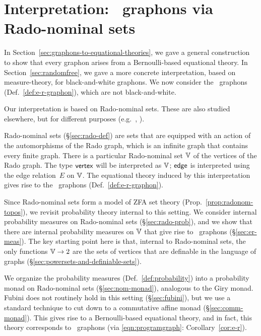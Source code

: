\section{Interpretation: \ErdosRenyi\ graphons via Rado-nominal sets}
\label{sec:ER-Rado}
In Section~\ref{sec:graphons-to-equational-theories}, we gave a general construction to show that every graphon arises from a Bernoulli-based equational theory.
In Section~\ref{sec:randomfree}, we gave a more concrete interpretation, based on measure-theory, for black-and-white graphons. 
We now consider the \ErdosRenyi\ graphons (Def.~\ref{def:e-r-graphon}), which are not black-and-white. 

Our interpretation is based on Rado-nominal sets. These are also studied elsewhere, but for different purposes (e.g.~\cite{lmcs:1157,bojancyk-place,homomorphisms-fodef}, \cite[\S1.9]{pitts-nom-book}).

Rado-nominal sets (\S\ref{sec:rado-def}) are sets that are equipped with an action of the automorphisms of the Rado graph, which is an infinite graph that contains every finite graph.
There is a particular Rado-nominal set $\mathbb{V}$ of the vertices of the Rado graph. The type $\mathsf{vertex}$ will be interpreted as $\mathbb{V}$;
$\mathsf{edge}$ is interpreted using the edge relation~$E$ on $\mathbb{V}$.
The equational theory induced by this interpretation gives rise to the \ErdosRenyi\ graphons (Def.~\ref{def:e-r-graphon}).

Since Rado-nominal sets form a model of ZFA set theory (Prop.~\ref{prop:radonom-topos}), we revisit
probability theory internal to this setting. We consider internal probability measures on Rado-nominal sets (\S\ref{sec:rado-prob}), and we show that there are internal probability measures on $\mathbb{V}$ that give rise to \ErdosRenyi\ graphons (\S\ref{sec:er-meas}). The key starting point here is that, internal to Rado-nominal sets, the only functions $\mathbb{V}\to 2$ are the sets of vertices that are definable in the language of graphs (\S\ref{sec:powersets-and-definiable-sets}). 

We organize the probability measures (Def.~\ref{def:probability}) into
a probability monad on Rado-nominal sets (\S\ref{sec:nom-monad}), analogous to the Giry monad. 
Fubini does not routinely hold in this setting (\S\ref{sec:fubini}), but we use a standard technique to cut down to a commutative affine monad (\S\ref{sec:comm-monad}). This gives rise to a Bernoulli-based equational theory, and in fact, this theory corresponds to \ErdosRenyi\ graphons (via \eqref{eqn:programgraph}: Corollary~\ref{cor:e-r}).

